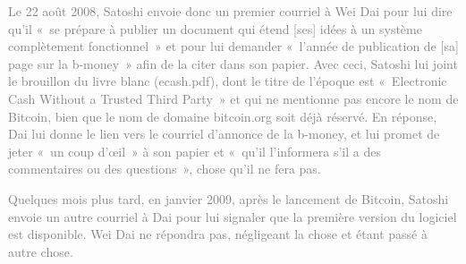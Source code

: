 \textcolor{gray}{Le 22 août 2008, Satoshi envoie donc un premier courriel à Wei Dai pour lui dire qu'il «~se prépare à publier un document qui étend [ses] idées à un système complètement fonctionnel~» et pour lui demander «~l'année de publication de [sa] page sur la b-money~» afin de la citer dans son papier. Avec ceci, Satoshi lui joint le brouillon du livre blanc (ecash.pdf), dont le titre de l'époque est «~Electronic Cash Without a Trusted Third Party~» et qui ne mentionne pas encore le nom de Bitcoin, bien que le nom de domaine bitcoin.org soit déjà réservé. En réponse, Dai lui donne le lien vers le courriel d'annonce de la b-money, et lui promet de jeter «~un coup d'œil~» à son papier et «~qu'il l'informera s'il a des commentaires ou des questions~», chose qu'il ne fera pas.}

\textcolor{gray}{Quelques mois plus tard, en janvier 2009, après le lancement de Bitcoin, Satoshi envoie un autre courriel à Dai pour lui signaler que la première version du logiciel est disponible. Wei Dai ne répondra pas, négligeant la chose et étant passé à autre chose.}



\printendnotes